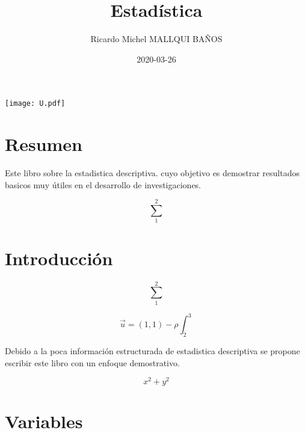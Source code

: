 \documentclass[10pt,]{krantz}
\title{Estadística}
\author{Ricardo Michel MALLQUI BAÑOS}
\institute{Universidad Nacional San Cristóbal De Huamanga}
\date{2020-03-26}
\let\oldincludegraphics\includegraphics
\renewcommand\includegraphics[2][]{%
  \oldincludegraphics[scale=0.85]{#2}
}
\theoremstyle{definition}
\theoremstyle{definition}
\theoremstyle{definition}
\theoremstyle{remark}
\begin{document}
\maketitle

\thispagestyle{empty}
\begin{center}
\texttt{[image: U.pdf]}
\end{center}


{
\hypersetup{linkcolor=}
\setcounter{tocdepth}{2}
\tableofcontents
}
\listoftables
\listoffigures
\newcommand{\N}{\mathbb{N}}
\newcommand{\R}{\mathbb{R}}
\newcommand{\CC}{\mathbb{C}}
\newcommand{\I}{\mathbb{I}}
\newcommand{\f}{\mathbb{f}}
\newcommand{\X}{\mathbb{X}}
\newcommand{\D}{\mathbb{D}}
\newcommand{\Z}{\mathbb{Z}}
\newcommand{\Q}{\mathbb{Q}}
\newcommand{\norm}[1]{\left\Vert#1\right\Vert}
\newcommand{\abs}[1]{\left\vert#1\right\vert}
\newcommand{\set}[1]{\left\{#1\right\}}
\newcommand{\seq}[1]{\left<#1\right>}
\newcommand{\co}[1]{\left[#1\right]}
\newcommand{\cc}[1]{\left(#1\right)}
\newcommand{\J}{\mathcal{J}}
\newcommand{\K}{\mathcal{K}}
\newcommand{\M}{\mathcal{M}}
\newcommand{\F}{\mathcal{F}}

\hypertarget{resumen}{%
\chapter*{Resumen}\label{resumen}}


Este libro sobre la estadistica descriptiva. cuyo objetivo es demostrar resultados basicos muy útiles en el desarrollo de investigaciones.

\[\sum_1^2\]

\hypertarget{introducciuxf3n}{%
\chapter*{Introducción}\label{introducciuxf3n}}


\[\sum_1^2\]

\[\vec{u}=(1,1)-\rho\int_2^3\]

Debido a la poca información estructurada de estadistica descriptiva se propone escribir este libro con un enfoque demostrativo.

\[x^2+y^2\]

\mainmatter

\hypertarget{variables}{%
\chapter{Variables}\label{variables}}
\end{document}
